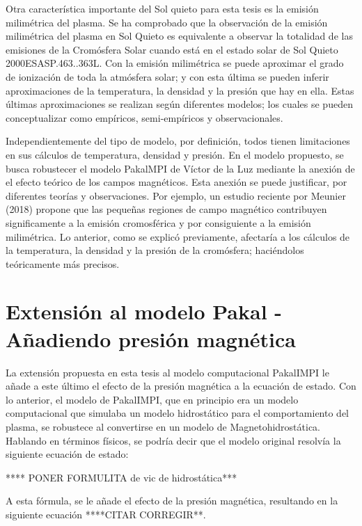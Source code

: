 \documentclass[9pt]{book}
\begin{document}
Otra caracter\'istica importante del Sol quieto para esta tesis es la emisi\'on milim\'etrica del plasma. Se ha comprobado que la observaci\'on de la emisi\'on milim\'etrica del plasma en Sol Quieto es equivalente a observar la totalidad de las emisiones de la Crom\'osfera Solar cuando est\'a en el estado solar de Sol Quieto 2000ESASP.463..363L. Con la emisi\'on milim\'etrica se puede aproximar el grado de ionizaci\'on de toda la atm\'osfera solar; y con esta \'ultima se pueden inferir aproximaciones de la temperatura, la densidad y la presi\'on que hay en ella. Estas \'ultimas aproximaciones se realizan seg\'un diferentes modelos; los cuales se pueden conceptualizar como emp\'iricos, semi-emp\'iricos y observacionales. 

Independientemente del tipo de modelo, por definici\'on, todos tienen limitaciones en sus c\'alculos de temperatura, densidad y presi\'on. En el modelo propuesto, se busca robustecer el modelo PakalMPI de V\'ictor de la Luz mediante la anexi\'on de el efecto te\'orico de los campos magn\'eticos. Esta anexi\'on se puede justificar, por diferentes teor\'ias y observaciones. Por ejemplo, un estudio reciente por Meunier (2018) propone que las peque\~nas regiones de campo magn\'etico contribuyen significamente a la emisi\'on cromosf\'erica y por consiguiente a la emisi\'on milim\'etrica. Lo anterior, como se explic\'o previamente, afectar\'ia a los c\'alculos de la temperatura, la densidad y la presi\'on de la crom\'osfera; haci\'endolos te\'oricamente m\'as precisos.

\chapter{Extensi\'on al modelo Pakal \-- A\~nadiendo presi\'on magn\'etica}

La extensi\'on propuesta en esta tesis al modelo computacional PakalIMPI le a\~nade a este \'ultimo el efecto de la presi\'on magn\'etica a la ecuaci\'on de estado. Con lo anterior, el modelo de PakalIMPI, que en principio era un modelo computacional que simulaba un modelo hidrost\'atico para el comportamiento del plasma, se robustece al convertirse en un modelo de Magnetohidrost\'atica. Hablando en t\'erminos f\'isicos, se podr\'ia decir que el modelo original resolv\'ia la siguiente ecuaci\'on de estado:

**** PONER FORMULITA de vic de hidrost\'atica***

A esta f\'ormula, se le a\~nade el efecto de la presi\'on magn\'etica, resultando en la siguiente ecuaci\'on ****CITAR CORREGIR**.
\end{document}
